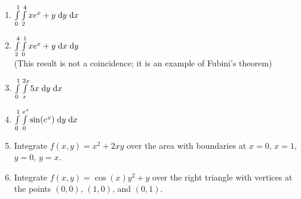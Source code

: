 \documentclass[letterpaper,11pt]{article}
\begin{document}
  \begin{enumerate}
    \item $\int \limits_{0}^{1} \int \limits_{2}^{4} x e^{x} + y \;\mathrm{d}y \;\mathrm{d}x$\\
      \newline
      \newline
      \newline
      \newline
      \newline

    \item $\int \limits_{2}^{4} \int \limits_{0}^{1} x e^{x} + y \;\mathrm{d}x \;\mathrm{d}y$\\
      (This result is not a coincidence; it is an example of Fubini's theorem)\\
      \newline
      \newline
      \newline
      \newline
      \newline

    \item $\int \limits_{0}^{1} \int \limits_{x}^{2 x} 5 x \;\mathrm{d}y \;\mathrm{d}x$\\
      \newline
      \newline
      \newline
      \newline
      \newline

    \item $\int \limits_{0}^{1} \int \limits_{0}^{e^{x}} \sin(e^x) \;\mathrm{d}y \;\mathrm{d}x$\\
      \newline
      \newline
      \newline
      \newline
      \newline

    \item Integrate $f(x, y) = x^2 + 2 x y$ over the area with boundaries at $x = 0$, $x = 1$, $y = 0$, $y = x$.\\
      \newpage

    \item Integrate $f(x, y) = \cos(x) y^{2} + y$ over the right triangle with vertices at the points $(0, 0)$, $(1, 0)$, and $(0, 1)$.\\
      \newline
      \newline
      \newline
      \newline
      \newline


\end{enumerate}
\end{document}
